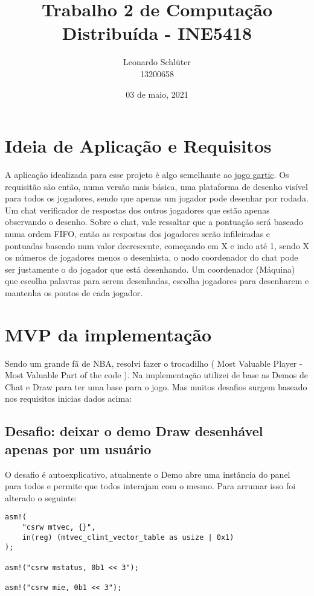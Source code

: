 \documentclass{article}
\title{Trabalho 2 de Computação Distribuída - INE5418}
\author{Leonardo Schlüter \\ 13200658}
\date{03 de maio, 2021}
\begin{document}
\maketitle

\section{Ideia de Aplicação e Requisitos}

A aplicação idealizada para esse projeto é algo semelhante ao \href{https://gartic.com.br/}{jogo gartic}. Os requisitão são então, numa versão mais básica, uma plataforma de desenho visível para todos os jogadores, sendo que apenas um jogador pode desenhar por rodada. Um chat verificador de respostas dos outros jogadores que estão apenas observando o desenho. Sobre o chat, vale ressaltar que a pontuação será baseado numa ordem FIFO, então as respostas dos jogadores serão infileiradas e pontuadas baseado num valor decrescente, começando em X e indo até 1, sendo X os números de jogadores menos o desenhista, o nodo coordenador do chat pode ser justamente o do jogador que está desenhando. Um coordenador (Máquina) que escolha palavras para serem desenhadas, escolha jogadores para desenharem e mantenha os pontos de cada jogador. 


\section{MVP da implementação}

Sendo um grande fã de NBA, resolvi fazer o trocadilho ( Most Valuable Player - Most Valuable Part of the code ). Na implementação utilizei de base as Demos de Chat e Draw para ter uma base para o jogo. Mas muitos desafios surgem baseado nos requisitos inicias dados acima:


\subsection{Desafio: deixar o demo Draw desenhável apenas por um usuário}

O desafio é autoexplicativo, atualmente o Demo abre uma instância do panel para todos e permite que todos interajam com o mesmo. Para arrumar isso foi alterado o seguinte: 


\begin{lstlisting} 
asm!(
    "csrw mtvec, {}",
    in(reg) (mtvec_clint_vector_table as usize | 0x1)
);

asm!("csrw mstatus, 0b1 << 3");

asm!("csrw mie, 0b1 << 3");
\end{lstlisting}
    
\end{document}
